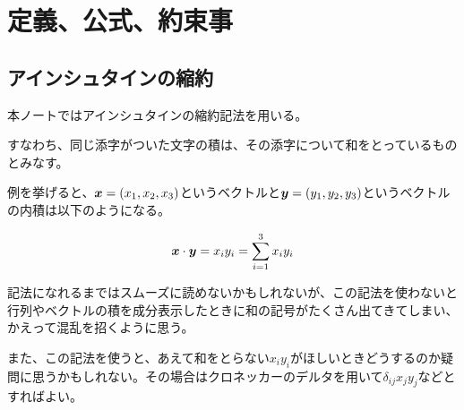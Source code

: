 \documentclass{jarticle}
\def\vec#1{\mbox{\boldmath $#1$}}
\begin{document}
 
\setcounter{section}{-1}
\section{定義、公式、約束事}
\subsection{アインシュタインの縮約}
本ノートではアインシュタインの縮約記法を用いる。

すなわち、同じ添字がついた文字の積は、その添字について和をとっているものとみなす。

例を挙げると、$\vec{x}=(x_1, x_2,x_3)$というベクトルと$\vec{y}=(y_1,y_2,y_3)$というベクトルの内積は以下のようになる。

\begin{eqnarray}
\vec{x} \cdot \vec{y} = x_i y_i = \sum _{i=1} ^3 x_i y_i
\end{eqnarray}

記法になれるまではスムーズに読めないかもしれないが、この記法を使わないと行列やベクトルの積を成分表示したときに和の記号がたくさん出てきてしまい、かえって混乱を招くように思う。

また、この記法を使うと、あえて和をとらない$ x_i y_i $がほしいときどうするのか疑問に思うかもしれない。その場合はクロネッカーのデルタを用いて$  \delta _{ij} x_j y_j$などとすればよい。
\end{document}
